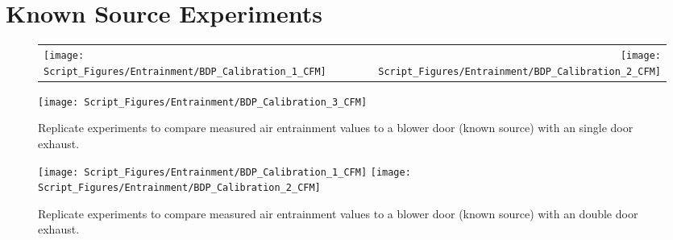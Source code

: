 \documentclass[12pt,oneside]{book}
\begin{document}
\clearpage

\chapter{Known Source Experiments}
\label{app:CFM_tests}

\begin{figure}[!ht]
\begin{tabular*}{\textwidth}{lr}
\texttt{[image: Script\_Figures/Entrainment/BDP\_Calibration\_1\_CFM]} &
\texttt{[image: Script\_Figures/Entrainment/BDP\_Calibration\_2\_CFM]} \\
\end{tabular*}
\centering
\texttt{[image: Script\_Figures/Entrainment/BDP\_Calibration\_3\_CFM]} 
\caption[Air Entrainment with Known Source: Blower Door Test with Single Door Exhaust]{Replicate experiments to compare measured air entrainment values to a blower door (known source) with an single door exhaust.}
\label{fig:blower_single_door}
\end{figure}

\clearpage

\begin{figure}[!ht]
\texttt{[image: Script\_Figures/Entrainment/BDP\_Calibration\_1\_CFM]} 
\texttt{[image: Script\_Figures/Entrainment/BDP\_Calibration\_2\_CFM]} 
\caption[Air Entrainment with Known Source: Blower Door Test with Double Door Exhaust]{Replicate experiments to compare measured air entrainment values to a blower door (known source) with an double door exhaust.}
\label{fig:blower_double_door}
\end{figure}
\end{document}
